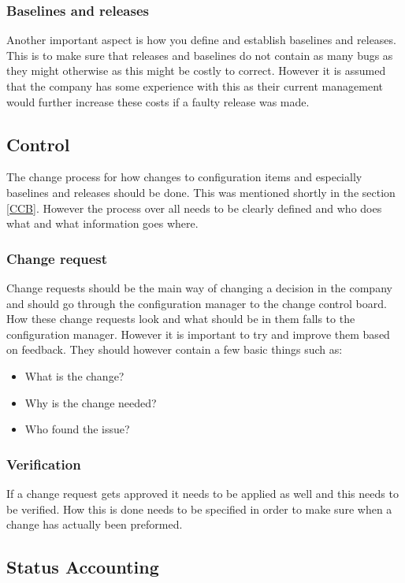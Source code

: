 \documentclass[a4paper]{article}
\begin{document}
\subsubsection{Baselines and releases}
Another important aspect is how you define and establish baselines and releases. This is to make sure that releases and baselines do not contain as many bugs as they might otherwise as this might be costly to correct. However it is assumed that the company has some experience with this as their current management would further increase these costs if a faulty release was made.

\subsection{Control}
The change process for how changes to configuration items and especially baselines and releases should be done. This was mentioned shortly in the section \ref{CCB}. However the process over all needs to be clearly defined and who does what and what information goes where.

\subsubsection{Change request}
Change requests should be the main way of changing a decision in the company and should go through the configuration manager to the change control board. How these change requests look and what should be in them falls to the configuration manager. However it is important to try and improve them based on feedback. They should however contain a few basic things such as:
\begin{itemize}
\item What is the change?
\item Why is the change needed?
\item Who found the issue?
\end{itemize}

\subsubsection{Verification}
If a change request gets approved it needs to be applied as well and this needs to be verified. How this is done needs to be specified in order to make sure when a change has actually been preformed.

\subsection{Status Accounting}
\end{document}
